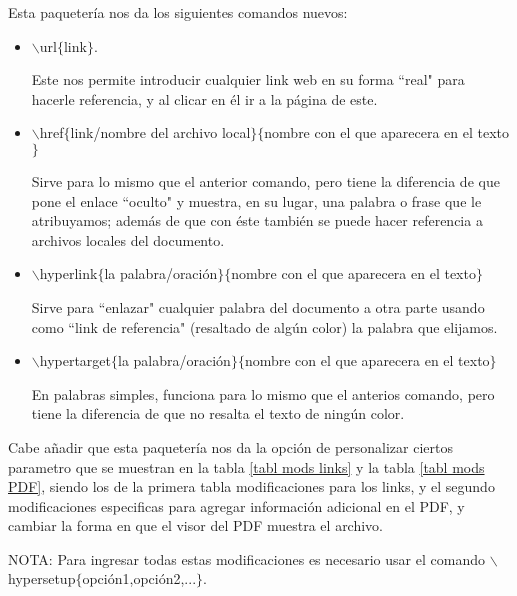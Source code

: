 \documentclass[12pt,letterpaper]{article}
\begin{document}
Esta paquetería nos da los siguientes comandos nuevos:

\begin{itemize}
    \item $\backslash$url$\{$link$\}$.\newline
    
    Este nos permite introducir cualquier link web en su forma  ``real" para hacerle referencia, y al clicar en él ir a la página de este.
    
    \item $\backslash$href$\{$link/nombre del archivo local$\}$$\{$nombre con el que aparecera en el texto$\}$\newline

    Sirve para lo mismo que el anterior comando, pero tiene la diferencia de que pone el enlace ``oculto" y muestra, en su lugar, una palabra o frase que le atribuyamos; además de que con éste también se puede hacer referencia a archivos locales del documento.
    
    \item $\backslash$hyperlink$\{$la palabra/oración$\}$$\{$nombre con el que aparecera en el texto$\}$\newline

    Sirve para ``enlazar" cualquier palabra del documento a otra parte usando como ``link de referencia" (resaltado de algún color) la palabra que elijamos.
    
    \item $\backslash$hypertarget$\{$la palabra/oración$\}$$\{$nombre con el que aparecera en el texto$\}$\newline

    En palabras simples, funciona para lo mismo que el anterios comando, pero tiene la diferencia de que no resalta el texto de ningún color.
    
\end{itemize}

Cabe añadir que esta paquetería nos da la opción de personalizar ciertos parametro que se muestran en la tabla \ref{tabl mods links} y la tabla \ref{tabl mods PDF}, siendo los de la primera tabla modificaciones para los links, y el segundo modificaciones especificas para agregar información adicional en el PDF, y cambiar la forma en que el visor del PDF muestra el archivo.\newline

NOTA: Para ingresar todas estas modificaciones es necesario usar el comando $\backslash$hypersetup$\{$opción1,opción2,...$\}$.
\end{document}

